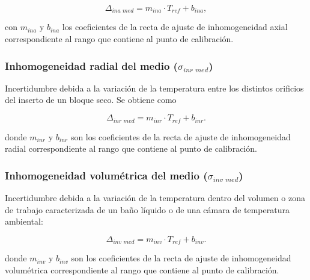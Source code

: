 \begin{equation}
    \Delta_{\textit{ina med}} = m_{ina}\cdot T_{ref} + b_{ina},
\end{equation}

con $m_{ina}$ y $b_{ina}$ los coeficientes de la recta de ajuste de inhomogeneidad axial correspondiente al rango que contiene al punto de calibración.


\subsubsection{Inhomogeneidad radial del medio ($\sigma_{\textit{inr med}}$)}

Incertidumbre debida a la variación de la temperatura entre los distintos orificios del inserto de un bloque seco. Se obtiene como

\begin{equation}
    \Delta_{\textit{inr med}} = m_{inr}\cdot T_{ref} + b_{inr}.
\end{equation}

donde $m_{inr}$ y $b_{inr}$ son los coeficientes de la recta de ajuste de inhomogeneidad radial correspondiente al rango que contiene al punto de calibración.


\subsubsection{Inhomogeneidad volumétrica del medio ($\sigma_{\textit{inv med}}$)}

Incertidumbre debida a la variación de la temperatura dentro del volumen o zona de trabajo caracterizada de un baño líquido o de una cámara de temperatura ambiental:

\begin{equation}
    \Delta_{\textit{inv med}} = m_{inv}\cdot T_{ref} + b_{inv}.
\end{equation}

donde $m_{inv}$ y $b_{inv}$ son los coeficientes de la recta de ajuste de inhomogeneidad volumétrica correspondiente al rango que contiene al punto de calibración.

